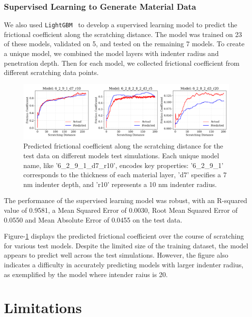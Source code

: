 \documentclass{article}
\begin{document}
\subsubsection{Supervised Learning to Generate Material Data}
We also used \texttt{LightGBM}~\cite{ke2017lightgbm} to develop a supervised learning model to predict the frictional coefficient along the scratching distance.
The model was trained on 23 of these models, validated on 5, and tested on the remaining 7 models. To create a unique model, we combined the model layers with indenter radius and penetration depth. Then for each model, we collected frictional coefficient from different scratching data points.

\begin{figure}[!h]
    \begin{center}
        \includegraphics[scale=0.30]{figures/material_fric_pred.png}
    \end{center}
    \caption{Predicted frictional coefficient along the scratching distance for the test data on different models test simulations. Each unique model name, like '6\_2\_9\_1\_d7\_r10', encodes key properties: '6\_2\_9\_1' corresponds to the thickness of each material layer, 'd7' specifies a 7 nm indenter depth, and 'r10' represents a 10 nm indenter radius.}

    \label{fig:material_fric_pred}
\end{figure}

The performance of the supervised learning model was robust, with an R-squared value of 0.9581, a Mean Squared Error of 0.0030, Root Mean Squared Error of 0.0550 and Mean Absolute Error of 0.0455 on the test data.


Figure-\ref{fig:material_fric_pred} displays the predicted frictional coefficient over the course of scratching for various test models. Despite the limited size of the training dataset, the model appears to predict well across the test simulations. However, the figure also indicates a difficulty in accurately predicting models with larger indenter radius, as exemplified by the model where intender raius is 20.


\section{Limitations}
\end{document}

